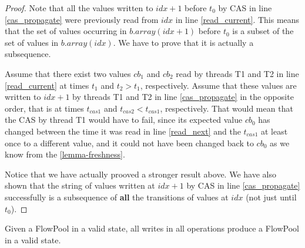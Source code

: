 \documentclass[runningheads,a4paper]{llncs}
\begin{document}
\begin{proof}
Note that all the values written to $idx + 1$ before $t_0$ by CAS in line \ref{cas_propagate} were
previously read from $idx$ in line \ref{read_current}.
This means that the set of values occurring in $b.array(idx + 1)$
before $t_0$ is a subset of the set of values in $b.array(idx)$.
We have to prove that it is actually a subsequence.

Assume that there exist two values $cb_1$ and $cb_2$ read by threads T1 and T2
in line \ref{read_current} at times $t_1$ and $t_2 > t_1$, respectively.
Assume that these values are written to $idx + 1$ by threads T1 and T2
in line \ref{cas_propagate} in the opposite order, that is at times
$t_{cas1}$ and $t_{cas2} < t_{cas1}$, respectively.
That would mean that the CAS by thread T1 would have to fail, since its expected
value $cb_0$ has changed between the time it was read in line \ref{read_next} and
the $t_{cas1}$ at least once to a different value, and it could not have been
changed back to $cb_0$ as we know from the \ref{lemma-freshness}.

Notice that we have actually prooved a stronger result above.
We have also shown that the string of values
written at $idx + 1$ by CAS in line \ref{cas_propagate} successfully is a subsequence
of \textbf{all} the transitions of values at $idx$ (not just until $t_0$).
\end{proof}


\begin{lemma}\label{lemma-valid}
Given a FlowPool in a valid state, all writes in all operations produce a FlowPool in a valid state.
\end{lemma}
\end{document}
